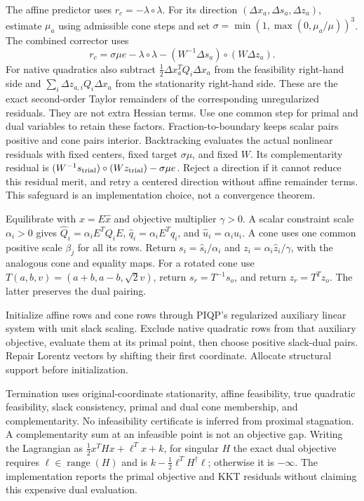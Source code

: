 \documentclass[10pt]{article}
\begin{document}
The affine predictor uses $r_c=-\lambda\circ\lambda$.
For its direction $(\Delta x_a,\Delta s_a,\Delta z_a)$, estimate
$\mu_a$ using admissible cone steps and set
$\sigma=\min(1,\max(0,\mu_a/\mu))^3$.
The combined corrector uses
\[
r_c=\sigma\mu e-\lambda\circ\lambda
 -(W^{-1}\Delta s_a)\circ(W\Delta z_a).
\]
For native quadratics also subtract
$\tfrac12\Delta x_a^TQ_i\Delta x_a$ from the feasibility right-hand side
and $\sum_i\Delta z_{a,i}Q_i\Delta x_a$ from the stationarity right-hand side.
These are the exact second-order Taylor remainders of the corresponding
unregularized residuals. They are not extra Hessian terms.
Use one common step for primal and dual variables to retain these factors.
Fraction-to-boundary keeps scalar pairs positive and cone pairs interior.
Backtracking evaluates the actual nonlinear residuals with fixed centers,
fixed target $\sigma\mu$, and fixed $W$. Its complementarity residual is
$(W^{-1}s_{\rm trial})\circ(Wz_{\rm trial})-\sigma\mu e$.
Reject a direction if it cannot reduce this
residual merit, and retry a centered direction without affine remainder terms.
This safeguard is an implementation choice, not a convergence theorem.

Equilibrate with $x=E\hat x$ and objective multiplier $\gamma>0$.
A scalar constraint scale $\alpha_i>0$ gives
$\hat Q_i=\alpha_iE^TQ_iE$, $\hat q_i=\alpha_iE^Tq_i$,
and $\hat u_i=\alpha_i u_i$.
A cone uses one common positive scale $\beta_j$ for all its rows.
Return $s_i=\hat s_i/\alpha_i$ and
$z_i=\alpha_i\hat z_i/\gamma$, with the analogous cone and equality maps.
For a rotated cone use
$T(a,b,v)=(a+b,a-b,\sqrt2v)$, return $s_r=T^{-1}s_o$,
and return $z_r=T^Tz_o$. The latter preserves the dual pairing.

Initialize affine rows and cone rows through PIQP's regularized auxiliary
linear system with unit slack scaling. Exclude native quadratic rows from
that auxiliary objective, evaluate them at its primal point, then choose
positive slack-dual pairs. Repair Lorentz vectors by shifting their first
coordinate. Allocate structural support before initialization.

Termination uses original-coordinate stationarity, affine feasibility,
true quadratic feasibility, slack consistency, primal and dual cone
membership, and complementarity. No infeasibility certificate is inferred
from proximal stagnation. A complementarity sum at an infeasible point is
not an objective gap. Writing the Lagrangian as $\tfrac12x^THx+\ell^Tx+k$,
for singular $H$ the exact dual objective requires
$\ell\in\operatorname{range}(H)$ and is
$k-\tfrac12\ell^TH^\dagger\ell$; otherwise it is $-\infty$.
The implementation reports the primal objective and KKT residuals without
claiming this expensive dual evaluation.
\end{document}
